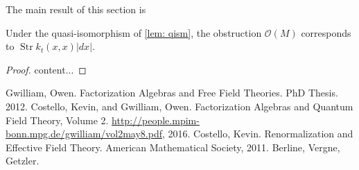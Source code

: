 \documentclass[11pt]{amsart}
\numberwithin{equation}{section}
\newcommand\Str{\operatorname{Str}}
\begin{document}
The main result of this section is
\begin{theorem}
Under the quasi-isomorphism of \ref{lem: qism}, the obstruction $\mathcal O(M)$ corresponds to $ \Str k_t(x,x)|dx|$.	
\end{theorem}
\begin{proof}
	content...
\end{proof}
\begin{thebibliography}{99}
Gwilliam, Owen. Factorization Algebras and Free Field Theories. PhD Thesis. 2012.
Costello, Kevin, and Gwilliam, Owen. Factorization Algebras and Quantum Field Theory, Volume 2. \url{http://people.mpim-bonn.mpg.de/gwilliam/vol2may8.pdf}, 2016.
Costello, Kevin. Renormalization and Effective Field Theory. American Mathematical Society, 2011.
Berline, Vergne, Getzler.
\end{thebibliography}
\end{document}

